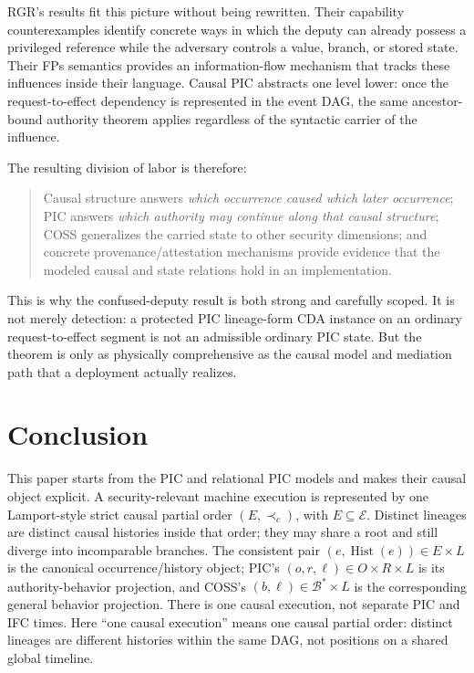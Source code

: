 \documentclass[10pt,twocolumn]{article}
\newcommand{\hb}{\prec_{c}}
\newcommand{\Hist}{\operatorname{Hist}}
\begin{document}
RGR's results fit this picture without being rewritten.  Their capability
counterexamples identify concrete ways in which the deputy can already possess
a privileged reference while the adversary controls a value, branch, or stored
state.  Their FPs semantics provides an information-flow mechanism that tracks
these influences inside their language.  Causal PIC abstracts one level lower:
once the request-to-effect dependency is represented in the event DAG, the same
ancestor-bound authority theorem applies regardless of the syntactic carrier of
the influence.

The resulting division of labor is therefore:
\begin{quote}
Causal structure answers \emph{which occurrence caused which later
occurrence}; PIC answers \emph{which authority may continue along that causal
structure}; COSS generalizes the carried state to other security dimensions;
and concrete provenance/attestation mechanisms provide evidence that the
modeled causal and state relations hold in an implementation.
\end{quote}

This is why the confused-deputy result is both strong and carefully scoped.  It
is not merely detection: a protected PIC lineage-form CDA instance on an
ordinary request-to-effect segment is not an admissible ordinary PIC state.
But the theorem is only as physically comprehensive as the causal model and
mediation path that a deployment actually realizes.



\section{Conclusion}

This paper starts from the PIC and relational PIC models and makes their causal
object explicit.  A security-relevant machine execution is represented by one
Lamport-style strict causal partial order $(E,\hb)$, with
$E\subseteq\mathcal E$.  Distinct lineages are
distinct causal histories inside that order; they may share a root and still
diverge into incomparable branches.  The consistent pair
$(e,\Hist(e))\in E\times L$ is the canonical occurrence/history object; PIC's
$(o,r,\ell)\in O\times R\times L$ is its authority-behavior projection, and
COSS's $(b,\ell)\in\mathcal B^*\times L$ is the corresponding general
behavior projection.  There is one causal execution, not separate PIC and IFC times.
Here ``one causal execution'' means one causal partial order: distinct lineages
are different histories within the same DAG, not positions on a shared global
timeline.
\end{document}
